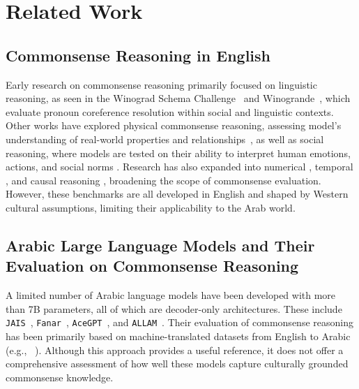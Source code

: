 \section{Related Work}
\subsection{Commonsense Reasoning in English} 


Early research on commonsense reasoning primarily focused on linguistic reasoning, as seen in the Winograd Schema Challenge~\citep{levesque2012winograd} and Winogrande~\citep{sakaguchi2019adversarial}, which evaluate pronoun coreference resolution within social and linguistic contexts. Other works have explored physical commonsense reasoning, assessing model's understanding of real-world properties and relationships~\citep{Bisk2019PIQARA}, as well as social reasoning, where models are tested on their ability to interpret human emotions, actions, and social norms \citep{sap2019socialiqa}. Research has also expanded into numerical \cite{lin-etal-2020-birds,akhtar-etal-2023-exploring}, temporal \cite{tan-etal-2023-towards}, and causal reasoning \cite{roemmele2011choice,du-etal-2022-e}, broadening the scope of commonsense evaluation. However, these benchmarks are all developed in English and shaped by Western cultural assumptions, limiting their applicability to the Arab world.

\subsection{Arabic Large Language Models and Their Evaluation on Commonsense Reasoning}
A limited number of Arabic language models have been developed with more than 7B parameters, all of which are decoder-only architectures. These include \texttt{JAIS}~\citep{sengupta2023jais}, \texttt{Fanar}~\citep{fanar}, \texttt{AceGPT}~\citep{huang2023acegpt}, and \texttt{ALLAM}~\citep{bari2024allam}. Their evaluation of commonsense reasoning has been primarily based on machine-translated datasets from English to Arabic (e.g., ~\citet{Tawalbeh2020IsTS, al2021commonsense}). Although this approach provides a useful reference, it does not offer a comprehensive assessment of how well these models capture culturally grounded commonsense knowledge.

